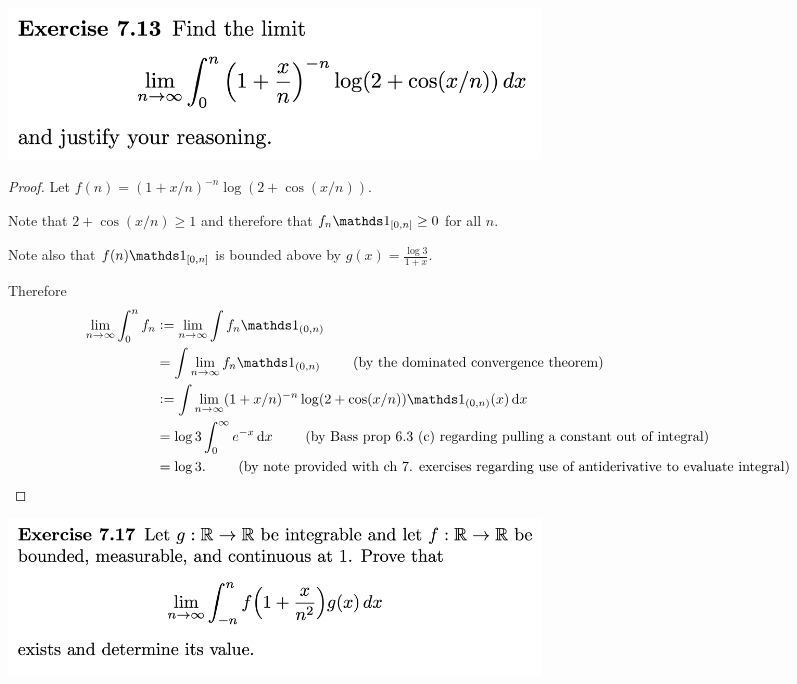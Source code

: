 \newpage
\begin{mdframed}
\includegraphics[width=400pt]{img/analysis--berkeley-202a-hw08-9931.png}
\end{mdframed}


\begin{proof}
  Let $f(n) = (1 + x/n)^{-n} \log(2 + \cos(x/n))$.

  Note that $2 + \cos(x/n) \geq 1$ and therefore that $f_n\ind_{[0, n]} \geq 0$ for all $n$.

  Note also that $f(n)\ind_{[0, n]}$ is bounded above by $g(x) = \frac{\log 3}{1 + x}$.

  Therefore
  \begin{align*}
    \limn \int_0^n f_n
    &:=\limn \int f_n\ind_{(0, n)}                                        \\
    &= \int \limn f_n\ind_{(0, n)}                                        ~~~~~~~ \text{(by the dominated convergence theorem)}\\
    &:= \int \limn (1 + x/n)^{-n} \log(2 + \cos(x/n))\ind_{(0, n)}(x)\dx  \\
    &= \log 3\int_0^\infty e^{-x} \dx                                     ~~~~~~~ \text{(by Bass prop 6.3 (c) regarding pulling a constant out of integral})\\
    &= \log 3.                                                           ~~~~~~~  \text{(by note provided with ch 7. exercises regarding use of antiderivative to evaluate integral)}
  \end{align*}

\end{proof}

\newpage
\begin{mdframed}
\includegraphics[width=400pt]{img/analysis--berkeley-202a-hw08-6e60.png}
\end{mdframed}

